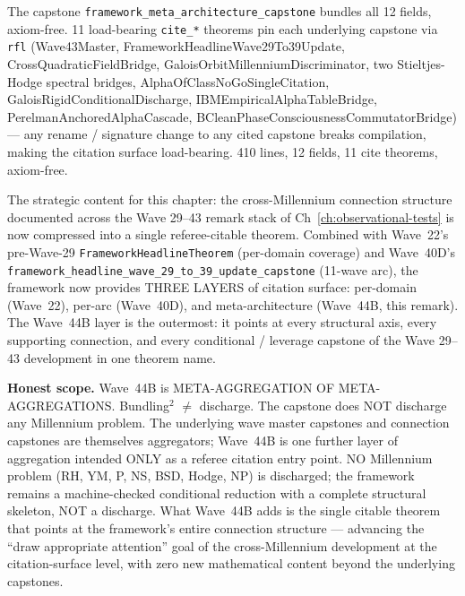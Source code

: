 \begin{remark}
\begin{itemize}
\begin{itemize}
  \end{itemize}
  The capstone \texttt{framework\_meta\_architecture\_capstone} bundles all 12 fields, axiom-free. 11 load-bearing \texttt{cite\_*} theorems pin each underlying capstone via \texttt{rfl} (Wave43Master, FrameworkHeadlineWave29To39Update, CrossQuadraticFieldBridge, GaloisOrbitMillenniumDiscriminator, two Stieltjes-Hodge spectral bridges, AlphaOfClassNoGoSingleCitation, GaloisRigidConditionalDischarge, IBMEmpiricalAlphaTableBridge, PerelmanAnchoredAlphaCascade, BCleanPhaseConsciousnessCommutatorBridge) --- any rename / signature change to any cited capstone breaks compilation, making the citation surface load-bearing. 410 lines, 12 fields, 11 cite theorems, axiom-free.
\end{itemize}
The strategic content for this chapter: the cross-Millennium connection structure documented across the Wave 29--43 remark stack of Ch~\ref{ch:observational-tests} is now compressed into a single referee-citable theorem. Combined with Wave~22's pre-Wave-29 \texttt{FrameworkHeadlineTheorem} (per-domain coverage) and Wave~40D's \texttt{framework\_headline\_wave\_29\_to\_39\_update\_capstone} (11-wave arc), the framework now provides THREE LAYERS of citation surface: per-domain (Wave~22), per-arc (Wave~40D), and meta-architecture (Wave~44B, this remark). The Wave~44B layer is the outermost: it points at every structural axis, every supporting connection, and every conditional / leverage capstone of the Wave 29--43 development in one theorem name.

\textbf{Honest scope.} Wave~44B is META-AGGREGATION OF META-AGGREGATIONS. Bundling$^2$ $\neq$ discharge. The capstone does NOT discharge any Millennium problem. The underlying wave master capstones and connection capstones are themselves aggregators; Wave~44B is one further layer of aggregation intended ONLY as a referee citation entry point. NO Millennium problem (RH, YM, P, NS, BSD, Hodge, NP) is discharged; the framework remains a machine-checked conditional reduction with a complete structural skeleton, NOT a discharge. What Wave~44B adds is the single citable theorem that points at the framework's entire connection structure --- advancing the ``draw appropriate attention'' goal of the cross-Millennium development at the citation-surface level, with zero new mathematical content beyond the underlying capstones.
\end{remark}

